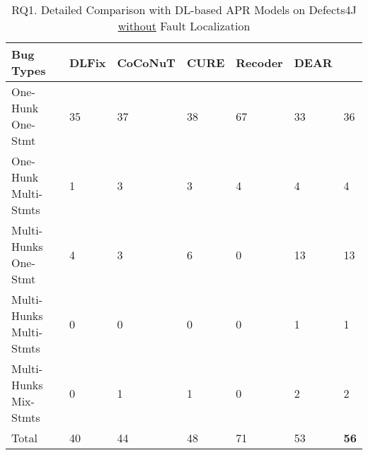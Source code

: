 
\begin{table}
	\caption{RQ1. Detailed Comparison with DL-based APR Models on Defects4J \underline{without} Fault Localization}
	\vspace{-7pt}
	\begin{center}
	  \small
          \tabcolsep 2.5pt
		\renewcommand{\arraystretch}{1} 
\begin{tabular}{p{2.9cm}<{\centering}|p{0.7cm}<{\centering}|p{1.1cm}<{\centering}|p{0.6cm}<{\centering}|p{0.8cm}<{\centering}|p{0.7cm}<{\centering}|p{0.7cm}}
			\hline
			Bug Types & DLFix& CoCoNuT & CURE & Recoder & DEAR & {\tool}\\\hline
			
			One-Hunk One-Stmt  & 35 & 37 & 38 & 67 & 33 & 36\\
			One-Hunk Multi-Stmts  & 1 &3 & 3 & 4 & 4 & 4\\ 
			Multi-Hunks One-Stmt  & 4 &3 & 6 & 0 & 13 & 13 \\
			Multi-Hunks Multi-Stmts  & 0 &0 & 0 & 0 & 1 & 1\\
			Multi-Hunks Mix-Stmts  & 0 & 1 & 1 & 0 & 2 & 2\\\hline
			Total & 40 & 44 & 48 & 71 & 53 & {\bf 56}\\
			\hline
		\end{tabular}
		\label{multi:tab}
	\end{center}
	\vspace{-4pt} %
\end{table}



